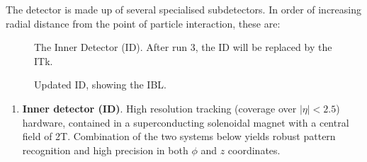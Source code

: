 The detector is made up of several specialised subdetectors. In order of increasing radial distance from the point of particle interaction, these are:
%
\begin{figure}[ht]
    \centering
    \caption{The Inner Detector (ID). After run 3, the ID will be replaced by the ITk.}
    \label{fig:ATLAS-id-run1
    }
\end{figure}
%

%
\begin{figure}[ht]
    \centering
    \caption{Updated ID, showing the IBL.}
    \label{fig:ATLAS-id-run2}
\end{figure}
%

\begin{enumerate}
    \item \textbf{Inner detector (ID)}. High resolution tracking (coverage over $|\eta| < 2.5$) hardware, contained in a superconducting solenoidal magnet with a central field of 2T. Combination of the two systems below yields robust pattern recognition and high precision in both $\phi$ and $z$ coordinates.


\end{enumerate}
